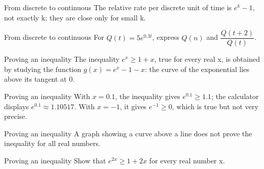 \documentclass[aspectratio=169,10pt]{beamer}
\begin{document}
\begin{frame}{From discrete to continuous}
The relative rate per discrete unit of time is \(e^k-1\), not exactly k; they are close only for small k.
\end{frame}
\begin{frame}{From discrete to continuous}
For \(Q(t)=5e^{0.3t}\), express \(Q(n)\) and \(\dfrac{Q(t+2)}{Q(t)}\).
\end{frame}
\begin{frame}{Proving an inequality}
The inequality \(e^x\geq1+x\), true for every real x, is obtained by studying the function \(g(x)=e^x-1-x\): the curve of the exponential lies above its tangent at 0.
\end{frame}
\begin{frame}{Proving an inequality}
With \(x=0.1\), the inequality gives \(e^{0.1}\geq1.1\); the calculator displays \(e^{0.1}\approx1.10517\). With \(x=-1\), it gives \(e^{-1}\geq0\), which is true but not very precise.
\end{frame}
\begin{frame}{Proving an inequality}
A graph showing a curve above a line does not prove the inequality for all real numbers.
\end{frame}
\begin{frame}{Proving an inequality}
Show that \(e^{2x}\geq1+2x\) for every real number x.
\end{frame}
\end{document}
